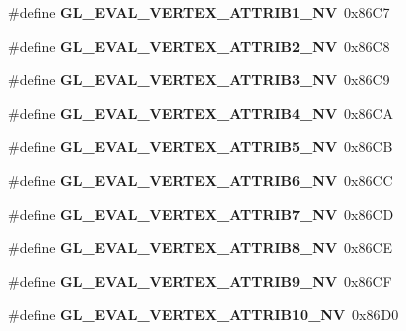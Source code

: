 \begin{DoxyCompactItemize}
\item 
\#define {\bfseries G\+L\+\_\+\+E\+V\+A\+L\+\_\+\+V\+E\+R\+T\+E\+X\+\_\+\+A\+T\+T\+R\+I\+B1\+\_\+\+N\+V}~0x86\+C7\label{_s_d_l__opengl_8h_a48620293c4613b7095e0ac4309e23cf7}

\item 
\#define {\bfseries G\+L\+\_\+\+E\+V\+A\+L\+\_\+\+V\+E\+R\+T\+E\+X\+\_\+\+A\+T\+T\+R\+I\+B2\+\_\+\+N\+V}~0x86\+C8\label{_s_d_l__opengl_8h_ad0bc8f7d6e92a5c4de35c9c578a544c1}

\item 
\#define {\bfseries G\+L\+\_\+\+E\+V\+A\+L\+\_\+\+V\+E\+R\+T\+E\+X\+\_\+\+A\+T\+T\+R\+I\+B3\+\_\+\+N\+V}~0x86\+C9\label{_s_d_l__opengl_8h_a4a11f9477c91f5d32e7a7c3d212b438c}

\item 
\#define {\bfseries G\+L\+\_\+\+E\+V\+A\+L\+\_\+\+V\+E\+R\+T\+E\+X\+\_\+\+A\+T\+T\+R\+I\+B4\+\_\+\+N\+V}~0x86\+C\+A\label{_s_d_l__opengl_8h_aff5a17977361b33a4b5476c303a6d08f}

\item 
\#define {\bfseries G\+L\+\_\+\+E\+V\+A\+L\+\_\+\+V\+E\+R\+T\+E\+X\+\_\+\+A\+T\+T\+R\+I\+B5\+\_\+\+N\+V}~0x86\+C\+B\label{_s_d_l__opengl_8h_a6c9cecac2e07ec6509bc7ecbc118ee55}

\item 
\#define {\bfseries G\+L\+\_\+\+E\+V\+A\+L\+\_\+\+V\+E\+R\+T\+E\+X\+\_\+\+A\+T\+T\+R\+I\+B6\+\_\+\+N\+V}~0x86\+C\+C\label{_s_d_l__opengl_8h_ab627cd579c5ce0bb1716be1b41ed7efd}

\item 
\#define {\bfseries G\+L\+\_\+\+E\+V\+A\+L\+\_\+\+V\+E\+R\+T\+E\+X\+\_\+\+A\+T\+T\+R\+I\+B7\+\_\+\+N\+V}~0x86\+C\+D\label{_s_d_l__opengl_8h_a14b691e0ae2cbc749066953836cb978a}

\item 
\#define {\bfseries G\+L\+\_\+\+E\+V\+A\+L\+\_\+\+V\+E\+R\+T\+E\+X\+\_\+\+A\+T\+T\+R\+I\+B8\+\_\+\+N\+V}~0x86\+C\+E\label{_s_d_l__opengl_8h_ae77da54964c2a043f5cb07012262dd4c}

\item 
\#define {\bfseries G\+L\+\_\+\+E\+V\+A\+L\+\_\+\+V\+E\+R\+T\+E\+X\+\_\+\+A\+T\+T\+R\+I\+B9\+\_\+\+N\+V}~0x86\+C\+F\label{_s_d_l__opengl_8h_acb3cf8de72e70bd779113b4b4d96239f}

\item 
\#define {\bfseries G\+L\+\_\+\+E\+V\+A\+L\+\_\+\+V\+E\+R\+T\+E\+X\+\_\+\+A\+T\+T\+R\+I\+B10\+\_\+\+N\+V}~0x86\+D0\label{_s_d_l__opengl_8h_a32e8c2e8b02bc8fdd6ce9c550baf8a9b}


\end{DoxyCompactItemize}
